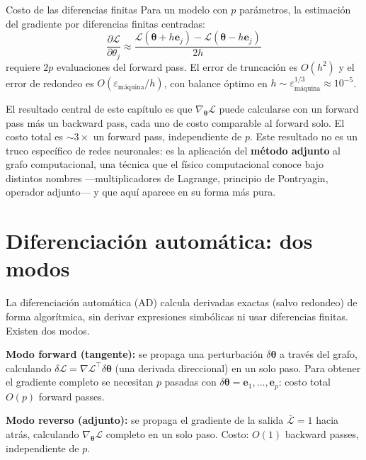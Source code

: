 \begin{proposicion}{Costo de las diferencias finitas}
\label{prop:costo_df}
Para un modelo con $p$ parámetros, la estimación del gradiente por
diferencias finitas centradas:
\[
  \frac{\partial\mathcal{L}}{\partial\theta_j}
  \approx \frac{\mathcal{L}(\bm{\theta}+h\bm{e}_j)
  - \mathcal{L}(\bm{\theta}-h\bm{e}_j)}{2h}
\]
requiere $2p$ evaluaciones del forward pass. El error de truncación es
$O(h^2)$ y el error de redondeo es
$O(\varepsilon_{\text{máquina}}/h)$, con balance óptimo en
$h \sim \varepsilon_{\text{máquina}}^{1/3} \approx 10^{-5}$.
\end{proposicion}

El resultado central de este capítulo es que
$\nabla_{\bm{\theta}}\mathcal{L}$ puede calcularse con un forward pass
más un backward pass, cada uno de costo comparable al forward solo. El
costo total es $\sim 3\times$ un forward pass, independiente de $p$. Este
resultado no es un truco específico de redes neuronales: es la aplicación
del \textbf{método adjunto} al grafo computacional, una técnica que el
físico computacional conoce bajo distintos nombres —multiplicadores de
Lagrange, principio de Pontryagin, operador adjunto— y que aquí aparece
en su forma más pura.

\section{Diferenciación automática: dos modos}
\label{sec:autodiff}


La diferenciación automática (AD) calcula derivadas exactas (salvo
redondeo) de forma algorítmica, sin derivar expresiones simbólicas ni
usar diferencias finitas. Existen dos modos.

\textbf{Modo forward (tangente):} se propaga una perturbación
$\delta\bm{\theta}$ a través del grafo, calculando
$\delta\mathcal{L} = \nabla\mathcal{L}^\top\delta\bm{\theta}$ (una
derivada direccional) en un solo paso. Para obtener el gradiente
completo se necesitan $p$ pasadas con
$\delta\bm{\theta} = \bm{e}_1, \ldots, \bm{e}_p$: costo total $O(p)$
forward passes.

\textbf{Modo reverso (adjunto):} se propaga el gradiente de la salida
$\bar{\mathcal{L}} = 1$ hacia atrás, calculando
$\nabla_{\bm{\theta}}\mathcal{L}$ completo en un solo paso. Costo:
$O(1)$ backward passes, independiente de $p$.

